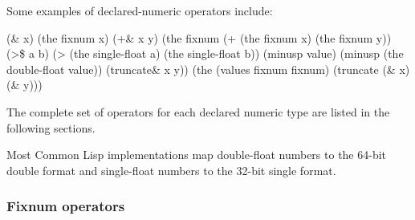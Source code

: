 \documentclass[10pt,twoside,english,pdftex]{article}
\begin{document}
Some examples of declared-numeric operators include:
%
\W\supp
\begin{example}
  (\& x) \expands (the fixnum x)
  (+\& x y) \expands (the fixnum (+ (the fixnum x) (the fixnum y))
  (>\$ a b) \expands (> (the single-float a) (the single-float b))
  (minusp$$ value) \expands (minusp (the double-float value))
  (truncate\& x y)) \expands (the (values fixnum fixnum) (truncate (\& x) (\& y)))
\end{example}
%
The complete set of operators for each declared numeric type are listed in the
following sections.

\fnnotes 
{}%
%
%
%
%
%
Most Common Lisp implementations map double-float numbers to the
64-bit 
double format and single-float numbers to the 32-bit 
single format.  

\T\clearpage
\W{}
\subsubsection{Fixnum  operators}
\end{document}
